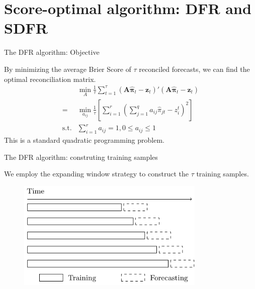 \documentclass[12pt]{beamer}
\begin{document}
\section{Score-optimal algorithm: DFR and SDFR}


\begin{frame}{The DFR algorithm: Objective}
    \begin{outline}
        \0 By minimizing the average Brier Score of $\tau$ reconciled forecasts, we can find the optimal reconciliation matrix.
        \[
            \begin{aligned}
          &\min_{A}\frac{1}{\tau}\sum_{t=1}^{\tau}(\mathbf{A}\hat{\boldsymbol{\pi}}_t - \mathbf{z}_t)'(\mathbf{A}\hat{\boldsymbol{\pi}}_t - \mathbf{z}_t) \\
          =&\min_{a_{ij}}\frac{1}{\tau}\left[\sum_{i=1}^r\left(\sum_{j=1}^q a_{ij}\hat\pi_{jt} - z_i^t\right)^2\right] \\
          \text{s.t.} & \sum_{i=1}^r a_{ij} = 1, 0\leq a_{ij} \leq 1
            \end{aligned}
        \]
        \0 This is a standard quadratic programming problem.
    \end{outline}
\end{frame}


\begin{frame}{The DFR algorithm: construting training samples}

We employ the expanding window strategy to construct the $\tau$ training samples.

\begin{figure}
\includegraphics[width=0.8\textwidth]{../manuscript/figures/rolling_window.pdf}
\end{figure}
\end{frame}
\end{document}
